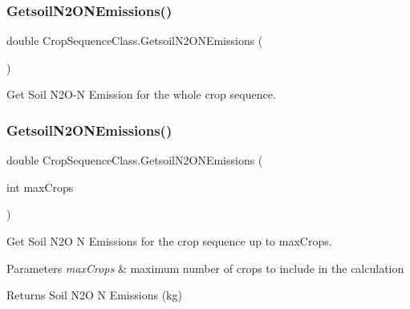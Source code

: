 \subsubsection{\texorpdfstring{GetsoilN2ONEmissions()}{GetsoilN2ONEmissions()}\hspace{0.1cm}{\footnotesize\ttfamily [1/2]}}
{\footnotesize\ttfamily double Crop\+Sequence\+Class.\+Getsoil\+N2\+O\+N\+Emissions (\begin{DoxyParamCaption}{ }\end{DoxyParamCaption})\hspace{0.3cm}{\ttfamily [inline]}}



Get Soil N2\+O-\/N Emission for the whole crop sequence. 

\mbox{\label{class_crop_sequence_class_a61d3f67fda6f158732ab8379a6e25c5f}} 
\subsubsection{\texorpdfstring{GetsoilN2ONEmissions()}{GetsoilN2ONEmissions()}\hspace{0.1cm}{\footnotesize\ttfamily [2/2]}}
{\footnotesize\ttfamily double Crop\+Sequence\+Class.\+Getsoil\+N2\+O\+N\+Emissions (\begin{DoxyParamCaption}\item[{int}]{max\+Crops }\end{DoxyParamCaption})\hspace{0.3cm}{\ttfamily [inline]}}



Get Soil N2O N Emissions for the crop sequence up to max\+Crops. 


\begin{DoxyParams}{Parameters}
{\em max\+Crops} & maximum number of crops to include in the calculation \\
\hline
\end{DoxyParams}
\begin{DoxyReturn}{Returns}
Soil N2O N Emissions (kg) 
\end{DoxyReturn}
\mbox{\label{class_crop_sequence_class_a648e63847bb75686e6a3199f30d0087b}} 
